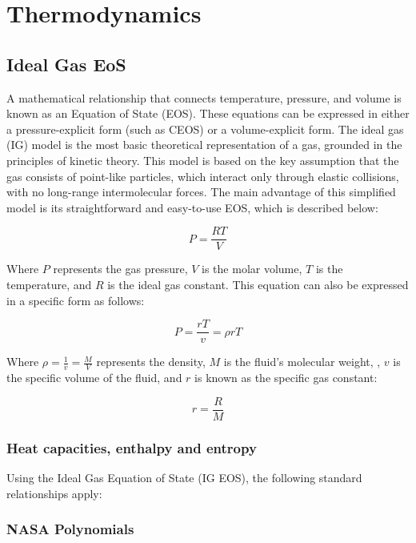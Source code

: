 \chapter{ Thermodynamics}
\chaptertoc{}

\section{Ideal Gas EoS}

A mathematical relationship that connects temperature, pressure, and volume is known as an Equation of State (EOS). These equations can be expressed in either a pressure-explicit form (such as CEOS) or a volume-explicit form. The ideal gas (IG) model is the most basic theoretical representation of a gas, grounded in the principles of kinetic theory. This model is based on the key assumption that the gas consists of point-like particles, which interact only through elastic collisions, with no long-range intermolecular forces. The main advantage of this simplified model is its straightforward and easy-to-use EOS, which is described below:

\begin{equation}
	P = \frac{RT}{V}
\end{equation}

Where $P$ represents the gas pressure, $V$ is the molar volume, $T$ is the temperature, and $R$ is the ideal gas constant. This equation can also be expressed in a specific form as follows:

\begin{equation}
	P = \frac{rT}{v} = \rho rT
\end{equation}

Where $\rho = \frac{1}{v}=\frac{M}{V}$ represents the density, $M$ is the fluid's molecular weight, , $v$ is the specific volume of the fluid, and $r$ is known as the specific gas constant:

\begin{equation}
	r = \frac{R}{M}
\end{equation}

	\subsection{Heat capacities, enthalpy and entropy}

	Using the Ideal Gas Equation of State (IG EOS), the following standard relationships apply:
	\subsection{NASA Polynomials}
	
